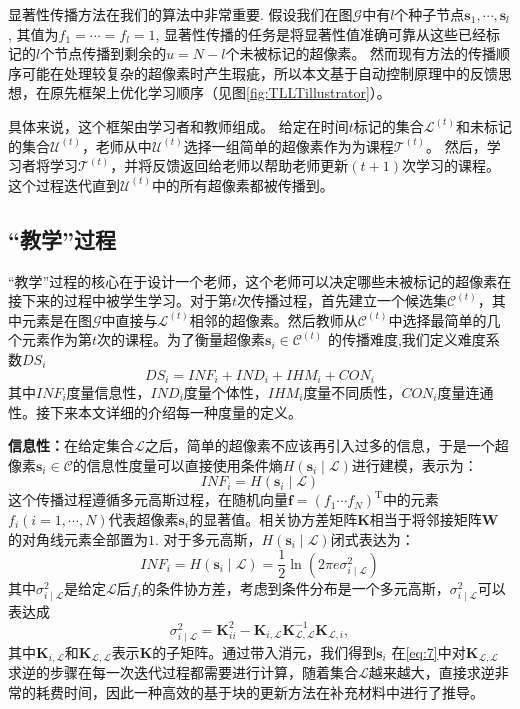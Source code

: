 显著性传播方法在我们的算法中非常重要. 假设我们在图$\mathcal{G}$中有$l$个种子节点$\mathbf{s}_1,\cdots , \mathbf{s}_l$, 其值为$f_1=\cdots = f_l =1$, 显著性传播的任务是将显著性值准确可靠从这些已经标记的$l$个节点传播到剩余的$u=N-l$个未被标记的超像素。
然而现有方法的传播顺序可能在处理较复杂的超像素时产生瑕疵，所以本文基于自动控制原理中的反馈思想，在原先框架上优化学习顺序（见图\ref{fig:TLLTillustrator}）。

具体来说，这个框架由学习者和教师组成。 给定在时间$t$标记的集合$\mathcal{L}^{(t)}$和未标记的集合$\mathcal{U}^{(t)}$，老师从中$\mathcal{U}^{(t)}$选择一组简单的超像素作为为课程$\mathcal{T}^{(t)}$。 然后，学习者将学习$\mathcal{T}^{(t)}$，并将反馈返回给老师以帮助老师更新$(t + 1)$次学习的课程。 这个过程迭代直到$\mathcal{U}^{(t)}$中的所有超像素都被传播到。

\subsection{``教学''过程}
``教学''过程的核心在于设计一个老师，这个老师可以决定哪些未被标记的超像素在接下来的过程中被学生学习。对于第$t$次传播过程，首先建立一个候选集$\mathcal{C}^{(t)}$，其中元素是在图$\mathcal{G}$中直接与$\mathcal{L}^{(t)}$相邻的超像素。然后教师从$\mathcal{C}^{(t)}$中选择最简单的几个元素作为第$t$次的课程。为了衡量超像素$\mathbf{s}_i \in \mathcal{C}^{(t)}$ 的传播难度,我们定义难度系数$DS_i$
\begin{equation}
DS_i=INF_i+IND_i+IHM_i+CON_i
\end{equation}
其中$INF_i$度量信息性，$IND_i$度量个体性，$IHM_i$度量不同质性，$CON_i$度量连通性。接下来本文详细的介绍每一种度量的定义。

\textbf{信息性：}在给定集合$\mathcal{L}$之后，简单的超像素不应该再引入过多的信息，于是一个超像素$\mathbf{s}_i \in \mathcal{C}$的信息性度量可以直接使用条件熵$H(\mathbf{s}_i \mid \mathcal{L})$进行建模，表示为：
\begin{equation}
INF_i=H(\mathbf{s}_i \mid \mathcal{L})
\end{equation}
这个传播过程遵循多元高斯过程，在随机向量$\mathbf{f}=(f_1 \cdots f_N)^ \mathrm{T}$中的元素$f_i(i=1, \cdots ,N)$代表超像素$\mathbf{s}_i$的显著值。相关协方差矩阵$\mathbf{K}$相当于将邻接矩阵$\mathbf{W}$的对角线元素全部置为$1$.
对于多元高斯，$H(\mathbf{s}_i \mid \mathcal{L})$闭式表达为：
\begin{equation}
INF_i=H(\mathbf{s}_i \mid \mathcal{L})=\frac{1}{2}\ln{(2 \pi e \sigma_{i \mid \mathcal{L}}^2)}
\end{equation}
其中$\sigma_{i \mid \mathcal{L}}^2$是给定$\mathcal{L}$后$f_i$的条件协方差，考虑到条件分布是一个多元高斯，$\sigma_{i \mid \mathcal{L}}^2$可以表达成
\begin{equation}
\label{eq:7}
\sigma_{i \mid \mathcal{L}}^2=\mathbf{K}_{ii}^2-\mathbf{K}_{i,\mathcal{L}} \mathbf{K}_{\mathcal{L},\mathcal{L}}^{-1} \mathbf{K}_{\mathcal{L},i},
\end{equation}
其中$\mathbf{K}_{i,\mathcal{L}} $和$\mathbf{K}_{\mathcal{L},\mathcal{L}} $表示$\mathbf{K}$的子矩阵。通过带入消元，我们得到$\mathbf{s}_i$
在\eqref{eq:7}中对$\mathbf{K}_{\mathcal{L},\mathcal{L}}$求逆的步骤在每一次迭代过程都需要进行计算，随着集合$\mathcal{L}$越来越大，直接求逆非常的耗费时间，因此一种高效的基于块的更新方法在补充材料中进行了推导。

